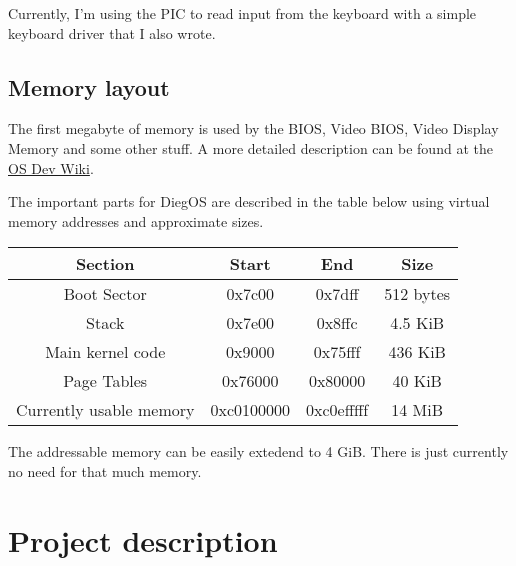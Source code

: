 \documentclass[12pt]{article}
\begin{document}
Currently, I'm using the PIC to read input from the keyboard with a simple
keyboard driver that I also wrote.

\subsection*{Memory layout}

The first megabyte of memory is used by the BIOS, Video BIOS, Video Display
Memory and some other stuff. A more detailed description can be found at the 
\href{https://wiki.osdev.org/Memory\_Map\_(x86)}{OS Dev Wiki}.

The important parts for DiegOS are described in the table below
using virtual memory addresses and approximate sizes.

\begin{center}
	\begin{tabular}{|c|c|c|c|}
		\hline
		Section & Start & End & Size \\
		\hline
		Boot Sector & 0x7c00 & 0x7dff & 512 bytes \\
		\hline
		Stack & 0x7e00 & 0x8ffc & 4.5 KiB \\
		\hline
		Main kernel code & 0x9000 & 0x75fff & 436 KiB \\
		\hline
		Page Tables & 0x76000 & 0x80000 & 40 KiB \\
		\hline
		Currently usable memory & 0xc0100000 & 0xc0efffff & 14 MiB \\
		\hline
	\end{tabular}
\end{center}

The addressable memory can be easily extedend to 4 GiB. 
There is just currently no need for that much memory.


\section*{Project description}
\end{document}

